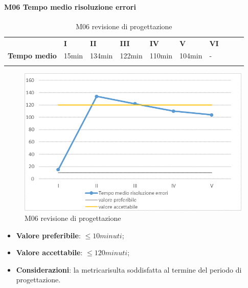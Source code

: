 \paragraph{M06 Tempo medio risoluzione errori} \mbox{}
\begin{longtable}[H!] {						
		>{}p{38mm}  		
		>{}p{12mm}
		>{}p{12mm}		
		>{}p{12mm}		
		>{}p{12mm}		
		>{}p{12mm}		
		>{}p{12mm}
		>{}p{12mm}
		>{}p{12mm}
		>{}p{12mm}
	}
	\rowcolor{gray!50}
	\textbf{} & \textbf{I} & \textbf{II} & \textbf{III} & \textbf{IV} & \textbf{V} & \textbf{VI} \TBstrut \\ [2mm]
	\textbf{Tempo medio} & 15min & 134min & 122min & 110min & 104min & - \TBstrut \\ [2mm]
	\rowcolor{white}
	\caption{M06 revisione di progettazione\glo}
\end{longtable}
\begin{figure}[H] 	
\includegraphics[width=\linewidth]{./img/grafici/RP12.png}	
\caption{M06 revisione di progettazione\glo}	
\end{figure}
\begin{itemize}
	\item \textbf{Valore preferibile}: $\le10minuti$;
	\item \textbf{Valore accettabile}: $\le120minuti$;
	\item \textbf{Considerazioni}: la metrica\glosp risulta soddisfatta al termine del periodo di progettazione\glo.
\end{itemize}

